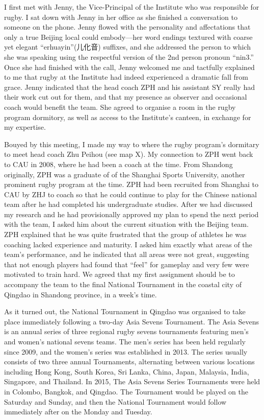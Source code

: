 I first met with Jenny, the Vice-Principal of the Institute who was responsible for rugby.  I sat down with Jenny in her office as she finished a conversation to someone on the phone. Jenny flowed with the personality and affectations that only a true Beijing local could embody---her word endings textured with coarse yet elegant ``erhuayin''(儿化音) suffixes, and she addressed the person to which she was speaking using the respectful version of the 2nd person pronoun ``nin3.''  Once she had finished with the call, Jenny welcomed me and tactfully explained to me that rugby at the Institute had indeed experienced a dramatic fall from grace.  Jenny indicated that the head coach ZPH and his assistant SY really had their work cut out for them, and that my presence as observer and occasional coach would benefit the team.  She agreed to organise a room in the rugby program dormitory, as well as access to the Institute's canteen, in exchange for my expertise.

Bouyed by this meeting, I made my way to where the rugby program's dormitary to meet head coach Zhu Peihou (see map X).  My connection to ZPH went back to CAU in 2008, where he had been a coach at the time. From Shandong originally, ZPH was a graduate of of the Shanghai Sports University, another prominent rugby program at the time.  ZPH had been recruited from Shanghai to CAU by ZHJ to coach so that he could continue to play for the Chinese national team after he had completed his undergraduate studies.  After we had discussed my research and he had provisionally approved my plan to spend the next period with the team, I asked him about the current situation with the Beijing team.  ZPH explained that he was quite frustrated that the group of athletes he was coaching lacked experience and maturity. I asked him exactly what areas of the team's performance, and he indicated that all areas were not great, suggesting that not enough players had found that ``feel'' for gameplay and very few were motivated to train hard.  We agreed that my first assignment should be to accompany the team to the final National Tournament in the coastal city of Qingdao in Shandong province, in a week's time.

As it turned out, the National Tournament in Qingdao was organised to take place immediately following a two-day Asia Sevens Tournament.  The Asia Sevens is an annual series of three regional rugby sevens tournaments featuring men's and women's national sevens teams.  The men's series has been held regularly since 2009, and the women's series was established in 2013. The series usually consists of two three annual Tournaments, alternating between various locations including Hong Kong, South Korea, Sri Lanka, China, Japan, Malaysia, India, Singapore, and Thailand.  In 2015, The Asia Sevens Series Tournaments were held in Colombo, Bangkok, and Qingdao. The Tournament would be played on the Saturday and Sunday, and then the National Tournament would follow immediately after on the Monday and Tuesday.

